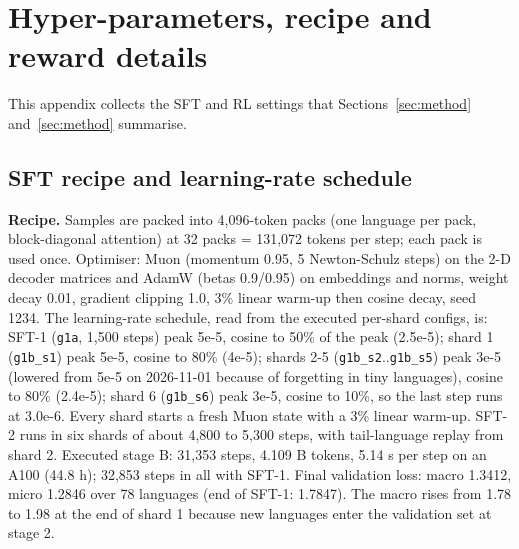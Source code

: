 \section{Hyper-parameters, recipe and reward details}\label{app:hyper}

This appendix collects the SFT and RL settings that Sections~\ref{sec:method} and~\ref{sec:method} summarise.

\subsection{SFT recipe and learning-rate schedule}

\textbf{Recipe.} Samples are packed into 4,096-token packs (one language per pack, block-diagonal attention) at 32 packs = 131,072 tokens per step; each pack is used once. Optimiser: Muon (momentum 0.95, 5 Newton-Schulz steps) on the 2-D decoder matrices and AdamW (betas 0.9/0.95) on embeddings and norms, weight decay 0.01, gradient clipping 1.0, 3\% linear warm-up then cosine decay, seed 1234. The learning-rate schedule, read from the executed per-shard configs, is: SFT-1 (\texttt{g1a}, 1,500 steps) peak 5e-5, cosine to 50\% of the peak (2.5e-5); shard 1 (\texttt{g1b\_\allowbreak{}s1}) peak 5e-5, cosine to 80\% (4e-5); shards 2-5 (\texttt{g1b\_\allowbreak{}s2}..\texttt{g1b\_\allowbreak{}s5}) peak 3e-5 (lowered from 5e-5 on 2026-11-01 because of forgetting in tiny languages), cosine to 80\% (2.4e-5); shard 6 (\texttt{g1b\_\allowbreak{}s6}) peak 3e-5, cosine to 10\%, so the last step runs at 3.0e-6. Every shard starts a fresh Muon state with a 3\% linear warm-up. SFT-2 runs in six shards of about 4,800 to 5,300 steps, with tail-language replay from shard 2. Executed stage B: 31,353 steps, 4.109 B tokens, 5.14 s per step on an A100 (44.8 h); 32,853 steps in all with SFT-1. Final validation loss: macro 1.3412, micro 1.2846 over 78 languages (end of SFT-1: 1.7847). The macro rises from 1.78 to 1.98 at the end of shard 1 because new languages enter the validation set at stage 2.  

